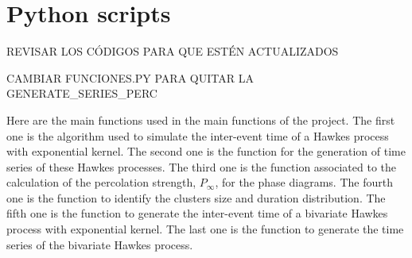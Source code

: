 \chapter{Python scripts}\label{ch:Anexo}
\begin{Large}
    REVISAR LOS CÓDIGOS PARA QUE ESTÉN ACTUALIZADOS

    CAMBIAR FUNCIONES.PY PARA QUITAR LA GENERATE\_SERIES\_PERC
\end{Large}
Here are the main functions used in the main functions of the project. The first one is the algorithm used to simulate the inter-event time of a Hawkes process with exponential kernel. 
The second one is the function for the generation of time series of these Hawkes processes. The third one is the function associated to the calculation of the percolation strength, $P_\infty$,
for the phase diagrams. The fourth one is the function to identify the clusters size and duration distribution. The fifth one is the function to generate the inter-event time of a 
bivariate Hawkes process with exponential kernel. The last one is the function to generate the time series of the bivariate Hawkes process. 


